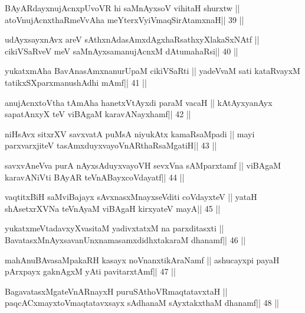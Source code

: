 \begin{shl}
BAyARdayxnujAcnxpUvoVR hi saMnAyxsoV vihitaH shurxtw ||
atoV\s nujAcnxthaRmeVvA\s\s ha meYterxVyiVmaqSirAtamxnaH\hfill || 39 ||
\end{shl}

\begin{shl}
udAyxsayxnAvx areV sAthxnAdasAmxdAgxhaRsathxyXlakaSxNAtf ||
cikiVSaRveV meV saMnAyxsamanujAcnxM dAtumahaRsi\hfill || 40 ||
\end{shl}

\begin{shl}
yukatxmAha BavAnasAmxnanurUpaM cikiVSaRti ||
yadeVvaM sati kataRvayxM tatikxSXparxmanushAdhi mAmf\hfill || 41 ||
\end{shl}

\begin{shl}
anujAcnxtoV\s tha tAmAha hanetxVtAyxdi paraM vacaH ||
kAtAyxyanAyx sapatAnxyX teV viBAgaM karavANayxhamf\hfill || 42 ||
\end{shl}

\begin{shl}
niHsAvx sitxrXV savxvatA puMsA niyukAtx kamaRsaMpadi ||
mayi parxvarxjiteV tasAmxduyxvayoVnARthaRsaMgatiH\hfill || 43 ||
\end{shl}

\begin{shl}
savxvAneVva purA nAyxsAduyxvayoVH sevxVna sAMparxtamf ||
viBAgaM karavANiVti BAyAR teVnABayxcoVdayatf\hfill || 44 ||
\end{shl}

\begin{shl}
vaqtitxBiH saMviBajayx sAvxnasxMnayxseVditi coVdayxteV ||
yataH shAsetxrXVNa teVnAyaM viBAgaH kirxyateV mayA\hfill || 45 ||
\end{shl}

\begin{shl}
yukatxmeVtadavxyXvasitaM yadivxtatxM na parxditasxti ||
BavatasxMnAyxsavanUnxnamasamxdidhxtakaraM dhanamf\hfill || 46 ||
\end{shl}

\begin{shl}
mahAnuBAvasaMpakaRH kasayx noVnanxtikAraNamf ||
ashucayxpi payaH pArxpayx gaknAgxM yAti pavitarxtAmf\hfill || 47 ||
\end{shl}

\begin{shl}
BagavatasxMgateVnARnayxH puruSAthoVR\s maqtatavxtaH ||
paqcACxmayxtoV\s maqtatavxsayx sAdhanaM sAyxtakxthaM dhanamf\hfill || 48 ||
\end{shl}

